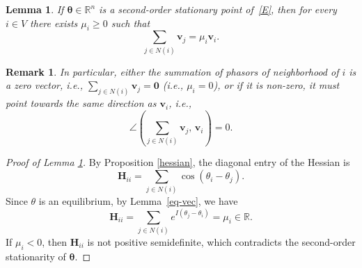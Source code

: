 \documentclass[11pt,reqno]{amsart}
\newtheorem{lemma}[theorem]{Lemma}
\newtheorem{remark}[theorem]{Remark}
\theoremstyle{definition}
\begin{document}
\begin{lemma}\label{stable-eq}
If $\boldsymbol{\theta}\in\mathbb R^n$ is a second-order stationary point of~\eqref{E},
then for every $i\in V$ there exists $\mu_i\ge 0$ such that $$\sum_{j\in N(i)} \boldsymbol{v}_j = \mu_i \boldsymbol{v}_i.$$
\end{lemma}

\begin{remark}
    In particular, either the summation of phasors of neighborhood of $i$ is a zero vector, i.e., $\sum_{j\in N(i)} \boldsymbol{v}_j=\boldsymbol 0$ (i.e., $\mu_i=0$),
or if it is non-zero, it must point towards the same direction as $\boldsymbol{v}_i$, i.e., $$\angle\!\left(\sum_{j\in N(i)} \boldsymbol{v}_j,\, \boldsymbol{v}_i\right)=0.$$
\end{remark}

\begin{proof}[Proof of Lemma \ref{stable-eq}]
By Proposition \ref{hessian}, the diagonal entry of the Hessian is $$\boldsymbol H_{ii} = \sum_{j\in N(i)} \cos(\theta_i-\theta_j).$$
Since $\theta$ is an equilibrium, by Lemma~\ref{eq-vec}, we have
$$\boldsymbol H_{ii} =\sum_{j\in N(i)} e^{I(\theta_j-\theta_i)}
= \mu_i  \in \mathbb R.$$
If $\mu_i<0$, then $\boldsymbol H_{ii}$ is not positive semidefinite,
which contradicts the second-order stationarity of $\boldsymbol{\theta}$.
\end{proof}
\end{document}

